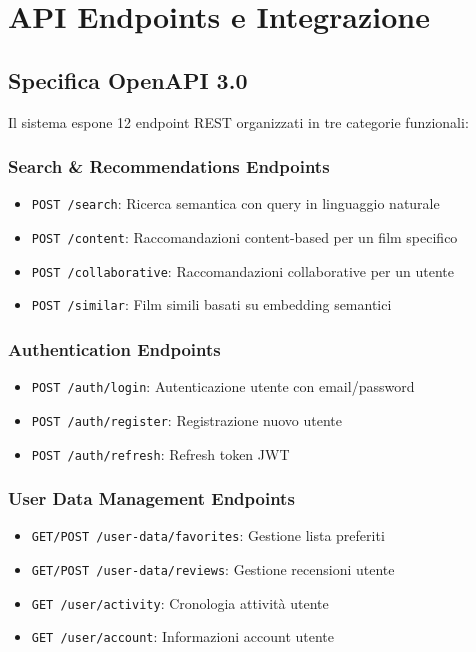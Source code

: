 \documentclass[11pt,a4paper]{article}
\begin{document}
\section{API Endpoints e Integrazione}

\subsection{Specifica OpenAPI 3.0}
Il sistema espone 12 endpoint REST organizzati in tre categorie funzionali:

\subsubsection{Search \& Recommendations Endpoints}
\begin{itemize}
  \item \texttt{POST /search}: Ricerca semantica con query in linguaggio naturale
  \item \texttt{POST /content}: Raccomandazioni content-based per un film specifico
  \item \texttt{POST /collaborative}: Raccomandazioni collaborative per un utente
  \item \texttt{POST /similar}: Film simili basati su embedding semantici
\end{itemize}

\subsubsection{Authentication Endpoints}
\begin{itemize}
  \item \texttt{POST /auth/login}: Autenticazione utente con email/password
  \item \texttt{POST /auth/register}: Registrazione nuovo utente
  \item \texttt{POST /auth/refresh}: Refresh token JWT
\end{itemize}

\subsubsection{User Data Management Endpoints}
\begin{itemize}
  \item \texttt{GET/POST /user-data/favorites}: Gestione lista preferiti
  \item \texttt{GET/POST /user-data/reviews}: Gestione recensioni utente
  \item \texttt{GET /user/activity}: Cronologia attività utente
  \item \texttt{GET /user/account}: Informazioni account utente
\end{itemize}
\end{document}
